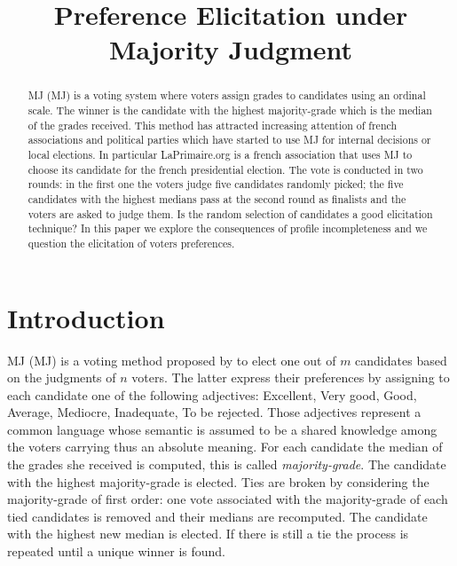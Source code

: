 \documentclass[version=3.21, pagesize, twoside=off, bibliography=totoc, DIV=calc, fontsize=12pt, a4paper]{scrartcl}
\title{Preference Elicitation under Majority Judgment}
\author{}
\begin{document}
\maketitle

\begin{abstract}
\acl{MJ} (\acs{MJ}) is a voting system where voters assign grades to candidates using an ordinal scale. The winner is the candidate with the highest majority-grade \textemdash which is the median of the grades received. This method has attracted increasing attention of french associations and political parties which have started to use \acs{MJ} for internal decisions or local elections. In particular LaPrimaire.org is a french association that uses \acs{MJ} to choose its candidate for the french presidential election. The vote is conducted in two rounds: in the first one the voters judge five candidates randomly picked; the five candidates with the highest medians pass at the second round as finalists and the voters are asked to judge them. Is the random selection of candidates a good elicitation technique? In this paper we explore the consequences of profile incompleteness and we question the elicitation of voters preferences.
\end{abstract}

\section{Introduction}
\label{sec:intro}
\acl{MJ} (\acs{MJ}) is a voting method proposed by \citet{Balinski2007,Balinski2011} to elect one out of $m$ candidates based on the judgments of $n$ voters. The latter express their preferences by assigning to each candidate one of the following adjectives: Excellent, Very good, Good, Average, Mediocre, Inadequate, To be rejected. Those adjectives represent a common language whose semantic is assumed to be a shared knowledge among the voters carrying thus an absolute meaning. For each candidate the median of the grades she received is computed, this is called \textit{majority-grade}. The candidate with the highest majority-grade is elected. Ties are broken by considering the majority-grade of first order: one vote associated with the majority-grade of each tied candidates is removed and their medians are recomputed. The candidate with the highest new median is elected. If there is still a tie the process is repeated until a unique winner is found. 
\end{document}
